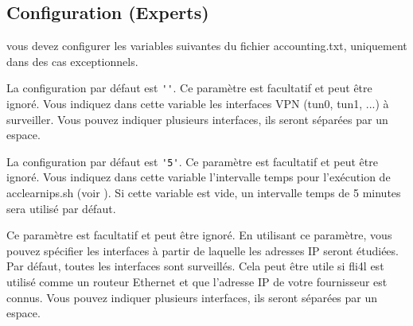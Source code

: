 \subsection{Configuration (Experts)}
vous devez configurer les variables suivantes du fichier accounting.txt,
uniquement dans des cas exceptionnels.

\begin{description}

La configuration par défaut est \verb*?''?.
Ce paramètre est facultatif et peut être ignoré. Vous indiquez dans cette
variable les interfaces VPN (tun0, tun1, ...) à surveiller. Vous pouvez
indiquer plusieurs interfaces, ils seront séparées par un espace.

La configuration par défaut est \verb*?'5'?.
Ce paramètre est facultatif et peut être ignoré. Vous indiquez dans cette
variable l'intervalle temps pour l'exécution de acclearnips.sh (voir
).
Si cette variable est vide, un intervalle temps de 5 minutes sera utilisé
par défaut.

Ce paramètre est facultatif et peut être ignoré. En utilisant ce paramètre,
vous pouvez spécifier les interfaces à partir de laquelle les adresses IP seront
étudiées. Par défaut, toutes les interfaces sont surveillés. Cela peut être utile
si fli4l est utilisé comme un routeur Ethernet et que l'adresse IP de votre
fournisseur est connus. Vous pouvez indiquer plusieurs interfaces, ils seront
séparées par un espace.


\end{description}
